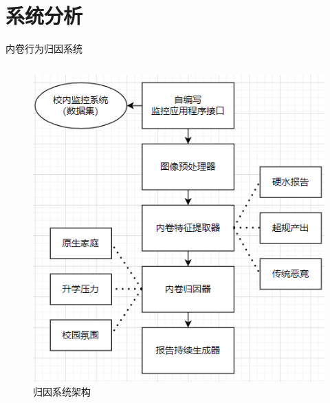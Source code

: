 %
%
%
%
\section{系统分析}
    \begin{frame}{内卷行为归因系统}
        \begin{columns}
            \begin{figure}
                \centering \includegraphics[width=.95\textwidth]{contents/figure/factor-analyzer.png}
                \caption{归因系统架构}
                \label{fig:factor-analyzer}
            \end{figure}


\end{columns}
\end{frame}
